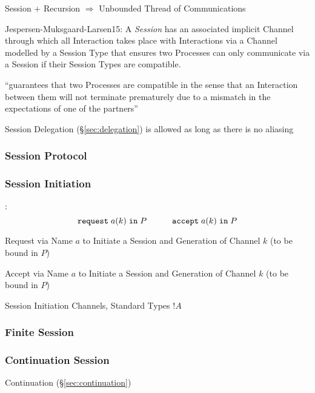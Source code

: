 Session + Recursion $\Rightarrow$ Unbounded Thread of Communications
\cite{honda-vasconcelos-kubo98}

Jespersen-Muksgaard-Larsen15: A \emph{Session} has an associated
implicit Channel through which all Interaction takes place with
Interactions via a Channel modelled by a Session Type that ensures two
Processes can only communicate via a Session if their Session Types
are compatible.

``guarantees that two Processes are compatible in the sense that an
Interaction between them will not terminate prematurely due to a
mismatch in the expectations of one of the partners''
\cite{gay-vasconcelos10}

Session Delegation (\S\ref{sec:delegation}) is allowed as long as
there is no aliasing



\subsubsection{Session Protocol}\label{sec:session_protocol}

\subsubsection{Session Initiation}\label{sec:session_initiation}

\cite{honda-vasconcelos-kubo98}:
\[
  \mathtt{request} \; a(k) \; \mathtt{in} \; P
  \quad\quad\quad
  \mathtt{accept} \; a(k) \; \mathtt{in} \; P
\]

Request via Name $a$ to Initiate a Session and Generation of Channel
$k$ (to be bound in $P$)

Accept via Name $a$ to Initiate a Session and Generation of Channel
$k$ (to be bound in $P$)

Session Initiation Channels, Standard Types $!A$



\subsubsection{Finite Session}\label{sec:finite_session}

\subsubsection{Continuation Session}\label{sec:continuation_session}

Continuation (\S\ref{sec:continuation})

